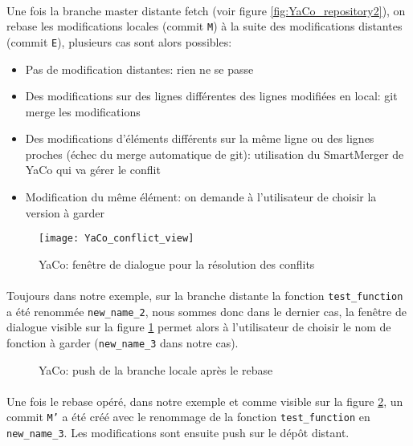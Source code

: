 \documentclass[11pt, book, english, french, standardlists]{upmethodology-document}
\begin{document}
				\paragraph*{}
					Une fois la branche master distante fetch (voir figure \ref{fig:YaCo_repository2}), on rebase les modifications locales (commit \texttt{M}) à la suite des modifications distantes (commit \texttt{E}), plusieurs cas sont alors possibles:
					\begin{itemize}
						\item Pas de modification distantes: rien ne se passe
						\item Des modifications sur des lignes différentes des lignes modifiées en local: git merge les modifications
						\item Des modifications d'éléments différents sur la même ligne ou des lignes proches (échec du merge automatique de git): utilisation du SmartMerger de YaCo qui va gérer le conflit
						\item Modification du même élément: on demande à l'utilisateur de choisir la version à garder
					\end{itemize}
				\begin{figure}[H]
					\centering
					\texttt{[image: YaCo\_conflict\_view]}
					\caption{YaCo: fenêtre de dialogue pour la résolution des conflits}
					\label{fig:YaCo_conflict_view}
				\end{figure}
				\paragraph*{}
					Toujours dans notre exemple, sur la branche distante la fonction \texttt{test\_function} a été renommée \texttt{new\_name\_2}, nous sommes donc dans le dernier cas, la fenêtre de dialogue visible sur la figure \ref{fig:YaCo_conflict_view} permet alors à l'utilisateur de choisir le nom de fonction à garder (\texttt{new\_name\_3} dans notre cas).
				\begin{figure}[H]
					\centering%
					\caption{YaCo: push de la branche locale après le rebase}%
					\label{fig:YaCo_repository3}%
				\end{figure}
				\paragraph*{}
					Une fois le rebase opéré, dans notre exemple et comme visible sur la figure \ref{fig:YaCo_repository3}, un commit \texttt{M'} a été créé avec le renommage de la fonction \texttt{test\_function} en \texttt{new\_name\_3}. Les modifications sont ensuite push sur le dépôt distant.
\end{document}
